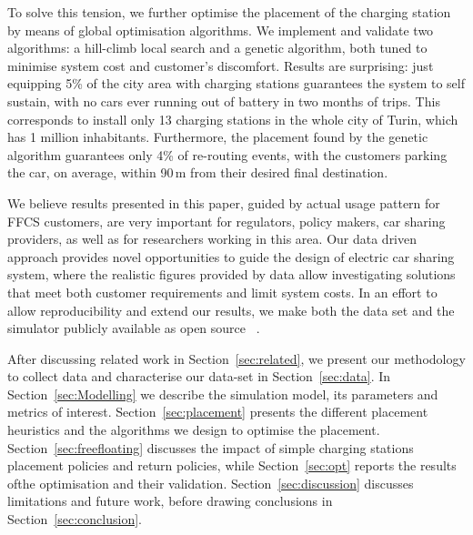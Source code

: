 To solve this tension, we further optimise the placement of the charging station by means of global optimisation algorithms. We  %
implement and validate two algorithms: a hill-climb local search and a genetic algorithm, both tuned to minimise system cost and customer's discomfort. 
Results are surprising: just equipping 5\% of the city area with charging stations guarantees the system to self sustain, with no cars ever running out of battery in two months of trips.
This corresponds to install only 13 charging stations in the whole city of Turin, which has 1 million inhabitants. %
Furthermore, the placement found by the genetic algorithm guarantees only 4\% of re-routing events, with the customers parking the car, on average, within 90\,m from their desired final destination.

We believe results presented in this paper, guided by actual usage pattern for FFCS customers, are very important for regulators, policy makers, car sharing providers, as well as for researchers working in this area. Our data driven approach provides novel opportunities to guide the design of electric car sharing system, where the realistic figures provided by data allow investigating solutions that  meet both customer requirements and limit system costs. 
In an effort to allow reproducibility and extend our results, we make both the data set and the simulator publicly available as open source~
\cite{MicheleGithub}.%



After discussing related work in Section~\ref{sec:related}, we present our methodology to collect data and characterise our data-set in Section~\ref{sec:data}. In  Section~\ref{sec:Modelling} we describe the simulation model, its parameters and metrics of interest. Section~\ref{sec:placement} presents the different placement heuristics and the algorithms we design to optimise the placement.  Section~\ref{sec:freefloating} discusses the impact of simple charging stations placement policies and return policies, while Section~\ref{sec:opt} reports the results ofthe optimisation and their validation. Section~\ref{sec:discussion} discusses limitations and future work, before drawing conclusions in Section~\ref{sec:conclusion}.
